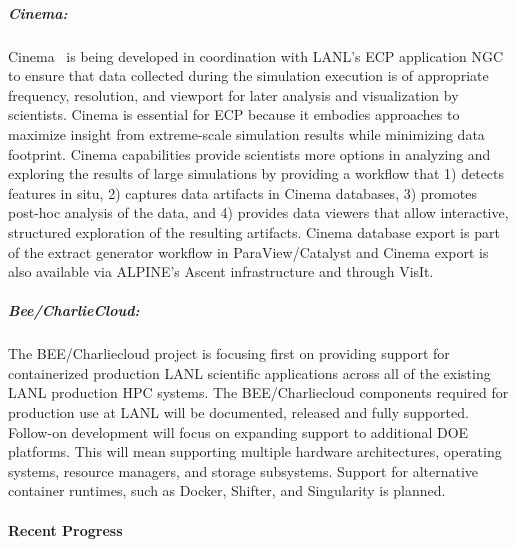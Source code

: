 \subparagraph{Cinema:}
Cinema~\cite{cinema:Ahrens:SC14} is being developed in coordination with
LANL's ECP application NGC to ensure that data collected during the simulation
execution is of appropriate frequency, resolution, and viewport for later
analysis and visualization by scientists.  
Cinema is essential for ECP because it embodies approaches to maximize insight from extreme-scale simulation results while minimizing data footprint.
Cinema capabilities provide scientists more options in analyzing and exploring the results of large simulations by providing a workflow that 1) detects features in situ, 2) captures data artifacts in Cinema databases, 3) promotes post-hoc analysis of the data, and 4) provides data viewers that allow interactive, structured exploration of the resulting artifacts. 
Cinema database export is part of the extract generator workflow in ParaView/Catalyst and Cinema export is also available via ALPINE's Ascent infrastructure and through VisIt.   



\subparagraph{Bee/CharlieCloud:}
The BEE/Charliecloud project is focusing first on providing support for
containerized production LANL scientific applications across all of the
existing LANL production HPC systems.  The BEE/Charliecloud components required
for production use at LANL will be documented, released and fully supported.
Follow-on development will focus on expanding support to additional DOE
platforms.  This will mean supporting multiple hardware architectures,
operating systems, resource managers, and storage subsystems.  Support for
alternative container runtimes, such as Docker, Shifter, and Singularity is
planned.

\paragraph{Recent Progress} \leavevmode \\

